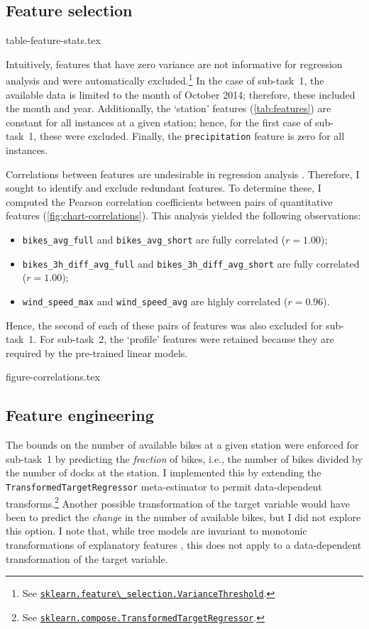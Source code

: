 \documentclass[11pt]{extarticle}
\newcommand{\windspeedmax}{\texttt{wind\_speed\_max}}
\newcommand{\windspeedavg}{\texttt{wind\_speed\_avg}}
\newcommand{\bikesavgfull}{\texttt{bikes\_avg\_full}}
\newcommand{\bikesavgshort}{\texttt{bikes\_avg\_short}}
\newcommand{\bikeshdiffavgfull}{\texttt{bikes\_3h\_diff\_avg\_full}}
\newcommand{\bikeshdiffavgshort}{\texttt{bikes\_3h\_diff\_avg\_short}}
\newcommand{\sklearn}[2]{\href{https://scikit-learn.org/stable/modules/generated/sklearn.#1.#2.html}{\lstinline|sklearn.#1.#2|}}
\begin{document}
\subsection{Feature selection}
\label{sec:feature-selection}

{table-feature-stats.tex}

Intuitively, features that have zero variance are not informative for regression
analysis and were automatically excluded.\footnote{See
  \sklearn{feature\_selection}{VarianceThreshold}.
}
In the case of sub-task~1, the available data is limited to the month of October 2014;
therefore, these included the month and year.
Additionally, the `station' features (\cref{tab:features}) are constant for all
instances at a given station; hence, for the first case of sub-task~1, these were
excluded.
Finally, the \texttt{precipitation} feature is zero for all instances.

Correlations between features are undesirable in regression analysis
\parencite{Alin2010}.
Therefore, I sought to identify and exclude redundant features.
To determine these, I computed the Pearson correlation coefficients between pairs of
quantitative features (\cref{fig:chart-correlations}).
This analysis yielded the following observations:
\begin{itemize}
  \item \texttt{\bikesavgfull} and \texttt{\bikesavgshort} are fully correlated ($r = 1.00$);
  \item \texttt{\bikeshdiffavgfull} and \texttt{\bikeshdiffavgshort} are fully correlated ($r  = 1.00$);
  \item \texttt{\windspeedmax} and \texttt{\windspeedavg} are highly correlated ($r = 0.96$).
\end{itemize}
Hence, the second of each of these pairs of features was also excluded for sub-task~1.
For sub-task~2, the `profile' features were retained because they are required by the
pre-trained linear models.

{figure-correlations.tex}

\subsection{Feature engineering}
\label{sec:feature-engineering}

The bounds on the number of available bikes at a given station were enforced for
sub-task~1 by predicting the \emph{fraction} of bikes, i.e., the number of bikes
divided by the number of docks at the station.
I implemented this by extending the \texttt{TransformedTargetRegressor} meta-estimator
to permit data-dependent transforms.\footnote{See
  \sklearn{compose}{TransformedTargetRegressor}.
}
Another possible transformation of the target variable would have been to predict the
\emph{change} in the number of available bikes, but I did not explore this option.
I note that, while tree models are invariant to monotonic transformations of
explanatory features \parencite[e.g.,][3184]{Death2000}, this does not apply to a
data-dependent transformation of the target variable.
\end{document}
